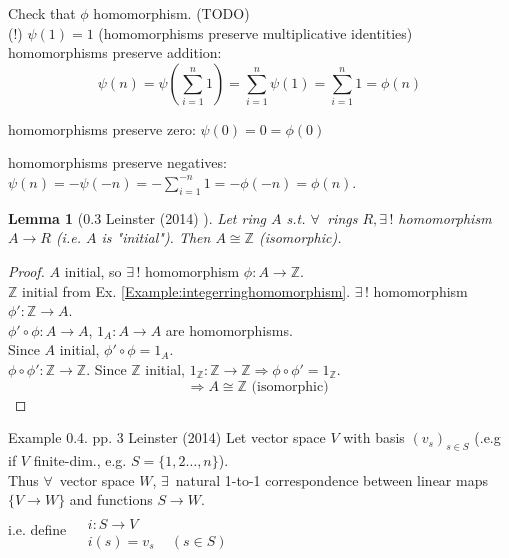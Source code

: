 \documentclass[10pt]{amsart}
\newtheorem{lemma}{Lemma}
\begin{document}
\begin{multicols*}{2}
Check that $\phi$ homomorphism. (TODO)\\

(!) $\psi(1)= 1$ (homomorphisms preserve multiplicative identities) \\
homomorphisms preserve addition:
\[
\psi(n) = \psi(\sum_{i=1}^n 1) = \sum_{i=1}^n \psi(1) = \sum_{i = 1}^n 1 = \phi(n)
\]

homomorphisms preserve zero: $\psi(0) = 0 = \phi(0)$

homomorphisms preserve negatives: $\psi(n) = -\psi(-n) = -\sum_{i=1}^{-n} 1 = -\phi(-n) = \phi(n)$.

\begin{lemma}[0.3 Leinster (2014) \cite{Lein2014}]
	Let ring $A$ s.t. $\forall \,$ rings $R, \exists \, !$ homomorphism $A \to R$ (i.e. $A$ is "initial"). Then $A \cong \mathbb{Z}$ (isomorphic). 	
\end{lemma}

\begin{proof}
		$A$ initial, so $\exists \, !$ homomorphism $\phi:A \to \mathbb{Z}$. \\
		$\mathbb{Z}$ initial from Ex. \ref{Example:integerringhomomorphism}. $\exists \, !$ homomorphism $\phi' : \mathbb{Z} \to A$. \\
		
		$\phi' \circ \phi : A \to A$, $1_A : A \to A$ are homomorphisms. \\
		Since $A$ initial, $\phi' \circ \phi = 1_A$. \\
		$\phi \circ \phi' : \mathbb{Z}\to \mathbb{Z}$.  Since $\mathbb{Z}$ initial, $1_{\mathbb{Z}} : \mathbb{Z} \to \mathbb{Z} \Longrightarrow \phi \circ \phi' = 1_{\mathbb{Z}}$. 
		\[
		\Longrightarrow A \cong \mathbb{Z} \text{ (isomorphic) }
		\]
\end{proof}

Example 0.4. pp. 3 Leinster (2014) \cite{Lein2014} Let vector space $V$ with basis $(v_s)_{s \in S}$ (.e.g if $V$ finite-dim., e.g. $S = \lbrace 1, 2 \dots , n \rbrace$).  \\
Thus $\forall \, $ vector space $W$, $\exists \, $ natural 1-to-1 correspondence between linear maps $\lbrace V \to W \rbrace$ and functions $S \to W$. \\
i.e. define $\begin{aligned} & \quad \\ 
& i : S \to V \\
& i(s) = v_s \quad \, (s \in S)\end{aligned}$ 


\end{multicols*}
\end{document}
